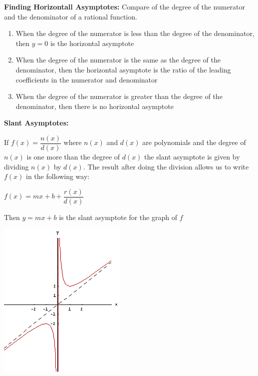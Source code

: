 \documentclass[12pt]{article}
\begin{document}
\textbf{Finding Horizontall Asymptotes:} Compare of the degree of the numerator and the denominator of a rational function. 

\begin{enumerate}
\item When the degree of the numerator is less than the degree of the denominator, then $y = 0$ is the horizontal asymptote
\item When the degree of the numerator is the same as the degree of the denominator, then the horizontal asymptote is the ratio of the leading coefficients in the numerator and denominator
\item When the degree of the numerator is greater than the degree of the denominator, then there is no horizontal asymptote
\end{enumerate}

\textbf{Slant Asymptotes:} 

If $f(x) =\dfrac{n(x)}{d(x)}$ where $n(x)$ and $d(x)$ are polynomials and the degree of $n(x)$ is one more than the degree of $d(x)$ the slant asymptote is given by dividing $n(x)$ by $d(x)$. The result after doing the division allows us to write $f(x)$ in the following way:
\newline

\centerline{$f(x) = mx + b + \dfrac{r(x)}{d(x)}$}

Then $y = mx+b$ is the slant asymptote for the graph of $f$

\centerline{\includegraphics{SlantAsymptote.png}}
\end{document}
